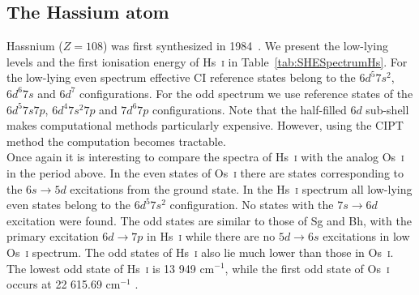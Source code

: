 \documentclass[10pt,a4paper, twoside, openright]{report}
\begin{document}
\subsection{The Hassium atom} \label{sec:Hs}

Hassnium ($Z=108$) was first synthesized in 1984~\cite{Munzenberg1984}. We present the low-lying levels and the first ionisation energy of Hs~\textsc{i} in Table~\ref{tab:SHESpectrumHs}. For the low-lying even spectrum effective CI reference states belong to the $6d^5 7s^2$, $6d^6 7s$ and $6d^7$ configurations. For the odd spectrum we use reference states of the $6d^5 7s 7p$, $6d^4 7s^2 7p$ and $7d^6 7p$ configurations.  Note that the half-filled $6d$ sub-shell makes computational methods particularly expensive. However, using the CIPT method the computation becomes tractable.  \\
\linebreak
Once again it is interesting to compare the spectra of Hs~\textsc{i} with the analog Os~\textsc{i} in the period above. In the even states of Os~\textsc{i} there are states corresponding to the $6s \rightarrow 5d$ excitations from the ground state. In the Hs~\textsc{i} spectrum all low-lying even states belong to the  $6d^5 7s^2$ configuration. No states with the $7s \rightarrow 6d$ excitation were found. The odd states are similar to those of Sg and Bh, with the primary excitation $6d \rightarrow 7p$ in Hs~\textsc{i} while there are no  $5d \rightarrow 6s$ excitations in low Os~\textsc{i} spectrum. The odd states of Hs~\textsc{i} also lie much lower than those in Os~\textsc{i}.  The lowest odd state of Hs~\textsc{i} is 13 949 cm$^{-1}$, while the first odd state of Os~\textsc{i} occurs at 22 615.69 cm$^{-1}$ \cite{NIST_ASD}. 
\end{document}

